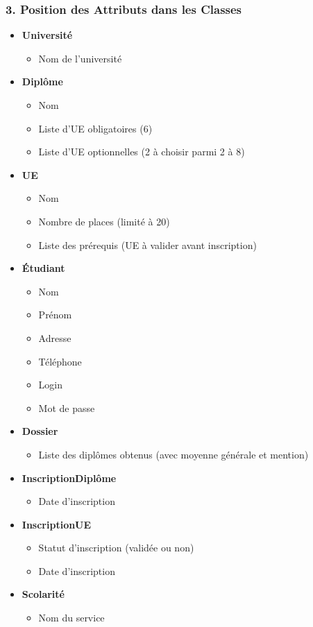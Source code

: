 \documentclass{article}
\begin{document}
\subsubsection*{3. Position des Attributs dans les Classes}

\begin{itemize}
  \item \textbf{Université}
  \begin{itemize}
    \item Nom de l’université
  \end{itemize}
  \item \textbf{Diplôme}
  \begin{itemize}
    \item Nom
    \item Liste d’UE obligatoires (6)
    \item Liste d’UE optionnelles (2 à choisir parmi 2 à 8)
  \end{itemize}
  \item \textbf{UE}
  \begin{itemize}
    \item Nom
    \item Nombre de places (limité à 20)
    \item Liste des prérequis (UE à valider avant inscription)
  \end{itemize}
  \item \textbf{Étudiant}
  \begin{itemize}
    \item Nom
    \item Prénom
    \item Adresse
    \item Téléphone
    \item Login
    \item Mot de passe
  \end{itemize}
  \item \textbf{Dossier}
  \begin{itemize}
    \item Liste des diplômes obtenus (avec moyenne générale et mention)
  \end{itemize}
  \item \textbf{InscriptionDiplôme}
  \begin{itemize}
    \item Date d’inscription
  \end{itemize}
  \item \textbf{InscriptionUE}
  \begin{itemize}
    \item Statut d’inscription (validée ou non)
    \item Date d’inscription
  \end{itemize}
  \item \textbf{Scolarité}
  \begin{itemize}
    \item Nom du service
  \end{itemize}
\end{itemize}
\end{document}
